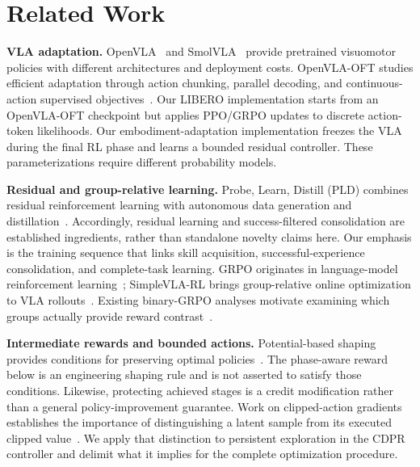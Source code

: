 \section{Related Work}\label{sec:related}
\textbf{VLA adaptation.} OpenVLA~\cite{openvla} and SmolVLA~\cite{smolvla} provide pretrained visuomotor policies with different architectures and deployment costs. OpenVLA-OFT studies efficient adaptation through action chunking, parallel decoding, and continuous-action supervised objectives~\cite{openvlaoft}. Our LIBERO implementation starts from an OpenVLA-OFT checkpoint but applies PPO/GRPO updates to discrete action-token likelihoods. Our embodiment-adaptation implementation freezes the VLA during the final RL phase and learns a bounded residual controller. These parameterizations require different probability models.

\textbf{Residual and group-relative learning.} Probe, Learn, Distill (PLD) combines residual reinforcement learning with autonomous data generation and distillation~\cite{pld}. Accordingly, residual learning and success-filtered consolidation are established ingredients, rather than standalone novelty claims here. Our emphasis is the training sequence that links skill acquisition, successful-experience consolidation, and complete-task learning. GRPO originates in language-model reinforcement learning~\cite{deepseekmath}; SimpleVLA-RL brings group-relative online optimization to VLA rollouts~\cite{simplevlarl}. Existing binary-GRPO analyses motivate examining which groups actually provide reward contrast~\cite{mroueh2026,bay2026}.

\textbf{Intermediate rewards and bounded actions.} Potential-based shaping provides conditions for preserving optimal policies~\cite{ng1999}. The phase-aware reward below is an engineering shaping rule and is not asserted to satisfy those conditions. Likewise, protecting achieved stages is a credit modification rather than a general policy-improvement guarantee. Work on clipped-action gradients establishes the importance of distinguishing a latent sample from its executed clipped value~\cite{capg}. We apply that distinction to persistent exploration in the CDPR controller and delimit what it implies for the complete optimization procedure.
